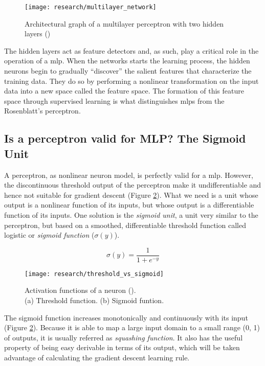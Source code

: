 \begin{figure}[!ht]
	\centering
	\texttt{[image: research/multilayer\_network]}
	\caption{Architectural graph of a multilayer perceptron with two hidden layers (\cite{haykin2009neural})}
	\label{fig:mlp_architectural_graph}
\end{figure}

The hidden layers act as feature detectors and, as such, play a critical role in the operation of a \gls{mlp}. When the networks starts the learning process, the hidden neurons begin to gradually “discover” the salient features that characterize the training data. They do so by performing a nonlinear transformation on
the input data into a new space called the feature space. The formation of this feature space through supervised learning is what distinguishes \glspl{mlp} from the Rosenblatt’s perceptron.

	\subsection{Is a perceptron valid for MLP? The Sigmoid Unit}
	A perceptron, as nonlinear neuron model, is perfectly valid for a \gls{mlp}. However, the discontinuous threshold output of the perceptron make it undifferentiable and hence not suitable for gradient descent (Figure \ref{fig:threshold_vs_sigmoid}). What we need is a unit whose output is a nonlinear function of its inputs, but whose output is a differentiable function of its inputs. One solution is the \textit{sigmoid unit}, a unit very similar to the perceptron, but based on a smoothed, differentiable threshold function called logistic or \textit{sigmoid function} ($\sigma(y)$).

		\begin{equation}
			\label{sigmoid_function}
			\sigma(y) = \frac{1}{1+e^{-y}}
		\end{equation}


	\begin{figure}[!ht]
		\centering
		\vspace{0.3cm}
		\texttt{[image: research/threshold\_vs\_sigmoid]}
		\caption
		{
			Activation functions of a neuron (\cite{haykin2009neural}). \\
			(a) Threshold function. \hspace{1.5cm} (b) Sigmoid funtion.
		}
		\label{fig:threshold_vs_sigmoid}
	\end{figure}

	The sigmoid function increases monotonically and continuously with its input (Figure \ref{fig:threshold_vs_sigmoid}). Because it is able to map a large input domain to a small range (0, 1) of outputs, it is usually referred as \textit{squashing function}. It also has the useful property of being easy derivable in terms of its output, which will be taken advantage of calculating the gradient descent learning rule.

